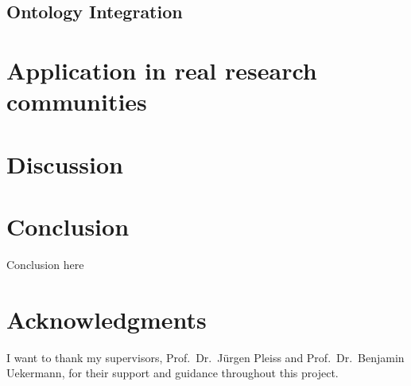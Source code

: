 \documentclass[lettersize,journal]{IEEEtran}
\begin{document}
 \subsection{Ontology Integration}\label{subsec:ontology_integration}
 


 \section{Application in real research communities}\label{sec:application}
 



 \section{Discussion}\label{sec:discussion}
 


 \section{Conclusion}\label{sec:conclusion} %

Conclusion here



\section*{Acknowledgments}
I want to thank my supervisors, Prof.\ Dr.\ Jürgen Pleiss and Prof.\ Dr.\ Benjamin Uekermann, for their support and guidance throughout this project.


 
 





%
%

%
\end{document}
